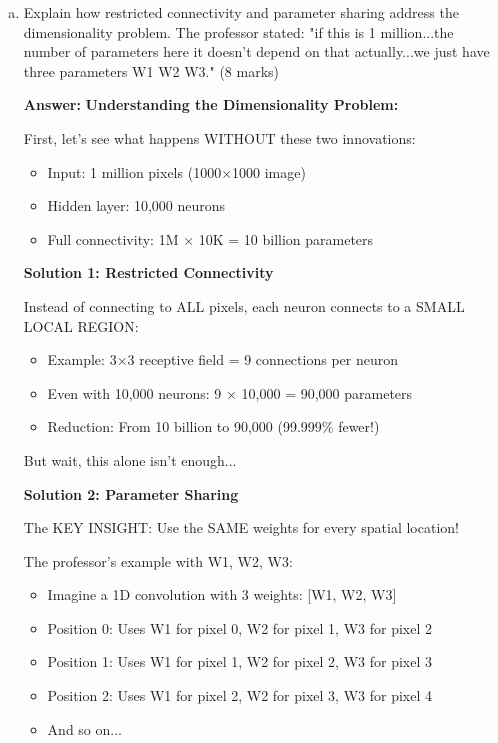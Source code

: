 \documentclass[12pt]{article}
\newcommand{\answer}[1]{{\color{answercolor}\textbf{Answer:} #1}}
\newcommand{\explanation}[1]{{\color{explanationcolor}#1}}
\begin{document}
\begin{enumerate}[(a)]
    \item Explain how restricted connectivity and parameter sharing address the dimensionality problem. The professor stated: "if this is 1 million...the number of parameters here it doesn't depend on that actually...we just have three parameters W1 W2 W3." \hfill (8 marks)
    
    \answer{
    \textbf{Understanding the Dimensionality Problem:}
    
    \explanation{
    First, let's see what happens WITHOUT these two innovations:
    \begin{itemize}
        \item Input: 1 million pixels (1000×1000 image)
        \item Hidden layer: 10,000 neurons
        \item Full connectivity: 1M × 10K = 10 billion parameters
    \end{itemize}
    }
    
    \textbf{Solution 1: Restricted Connectivity}
    
    \explanation{
    Instead of connecting to ALL pixels, each neuron connects to a SMALL LOCAL REGION:
    \begin{itemize}
        \item Example: 3×3 receptive field = 9 connections per neuron
        \item Even with 10,000 neurons: 9 × 10,000 = 90,000 parameters
        \item Reduction: From 10 billion to 90,000 (99.999\% fewer!)
    \end{itemize}
    
    But wait, this alone isn't enough...
    }
    
    \textbf{Solution 2: Parameter Sharing}
    
    \explanation{
    The KEY INSIGHT: Use the SAME weights for every spatial location!
    
    The professor's example with W1, W2, W3:
    \begin{itemize}
        \item Imagine a 1D convolution with 3 weights: [W1, W2, W3]
        \item Position 0: Uses W1 for pixel 0, W2 for pixel 1, W3 for pixel 2
        \item Position 1: Uses W1 for pixel 1, W2 for pixel 2, W3 for pixel 3
        \item Position 2: Uses W1 for pixel 2, W2 for pixel 3, W3 for pixel 4
        \item And so on...
    \end{itemize}
    
}}
\end{enumerate}
\end{document}
